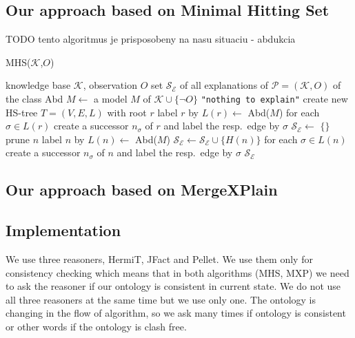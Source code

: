 \documentclass[12pt,a4paper]{article}
\begin{document}
\subsection{Our approach based on Minimal Hitting Set}

TODO tento algoritmus je prisposobeny na nasu situaciu - abdukcia
\begin{algorithm}[H] 
	\footnotesize
	\caption{MHS($\mathcal{K}$,$O$)} \label{alg:mhs}
	\label{alg:SOA}
	\begin{algorithmic}[1]
		\Require knowledge base $\mathcal{K}$, observation $O$
		\Ensure set $\mathcal{S}_{\mathcal{E}}$ of all explanations of $\mathcal{P}=(\mathcal{K},O)$ of the class Abd
		\State $M \gets$ a model $M$ of $\mathcal{K} \cup \{\neg O\}$
		\label{soal:ta_init}
		\State \Return \texttt{"nothing to explain"} %
		\label{soal:nte}
		\EndIf %
		\label{soal:init:e}
		\State create new HS-tree $T=(V,E,L)$ with root $r$ %
		\label{soal:root:b}
		\State label $r$ by $L(r) \gets$ Abd($M$)
		\label{soal:r-label}
		\State for each $\sigma\in L(r)$ create a successor $n_\sigma$ of $r$
		and label the resp.\ edge by $\sigma$ %
		\label{soal:root:e}
		\State $\mathcal{S}_{\mathcal{E}} \gets$ $\{\}$ %
		\label{soal:SE:init}
		\label{soal:loop:b}
		\label{soal:prune:b}
		\State prune $n$
		\label{soal:prune:e}
		\label{soal:ta}
		\State label $n$ by $L(n) \gets$  Abd($M$) 
		\Else %
		\State $\mathcal{S}_\mathcal{E} \gets \mathcal{S}_\mathcal{E} \cup \{H(n)\}$ 
		\EndIf
		\State for each $\sigma\in L(n)$ create a successor $n_\sigma$ of $n$
		and label the resp.\ edge by $\sigma$ %
		\label{soal:modproc:e}
		\EndWhile
		\label{soal:loop:e}
		\label{soal:output}
		\State \Return $\mathcal{S}_\mathcal{E}$
	\end{algorithmic}
\end{algorithm}

\subsection{Our approach based on MergeXPlain}

\subsection{Implementation}
We use three reasoners, HermiT, JFact and Pellet. We use them only for consistency checking which means that in both algorithms (MHS, MXP) we need to ask the reasoner if our ontology is consistent in current state. We do not use all three reasoners at the same time but we use only one. The ontology is changing in the flow of algorithm, so we ask many times if ontology is consistent or other words if the ontology is clash free.
\end{document}
